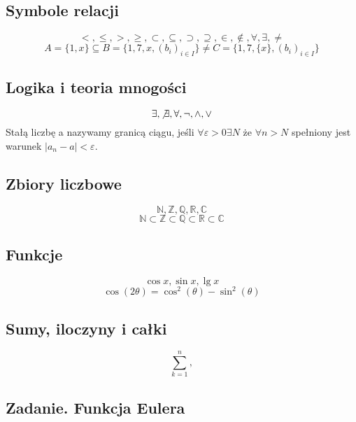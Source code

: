 \documentclass[a4paper, 12pt]{amsart}
\begin{document}
\subsection{Symbole relacji}
\begin{displaymath}
<, \leq, >, \geq, \subset, \subseteq, \supset, \supseteq, \in, \notin, \forall, \exists, \neq
\end{displaymath}
\begin{displaymath}
A = \{1,x\} \subseteq B = \{1,7,x,(b_{i})_{i \in I}\} \not = C = \{1,7, \{x\}, (b_{i})_{i \in I} \}
\end{displaymath}
\subsection{Logika i teoria mnogości}
\begin{displaymath}
\exists, \not\exists, \forall, \neg, \land, \lor
\end{displaymath}
Stałą liczbę a nazywamy granicą ciągu, jeśli $\forall \varepsilon > 0 \exists N$ że $\forall n > N$ spełniony jest warunek $|a_{n}-a| < \varepsilon$.
\subsection{Zbiory liczbowe}
\begin{displaymath}
\mathbb{N}, \mathbb{Z}, \mathbb{Q}, \mathbb{R}, \mathbb{C}
\end{displaymath}
\begin{displaymath}
\mathbb{N} \subset \mathbb{Z} \subset \mathbb{Q} \subset \mathbb{R} \subset \mathbb{C}
\end{displaymath}
\subsection{Funkcje}
\begin{displaymath}
\cos x, \sin x, \lg x
\end{displaymath}
\begin{displaymath}
\cos(2\theta) = \cos^{2}(\theta) - \sin^{2}(\theta)
\end{displaymath}
\subsection{Sumy, iloczyny i całki}
\begin{displaymath}
\sum _{k=1}^{n},
\end{displaymath}
\subsection{Zadanie. Funkcja Eulera}
\end{document}
